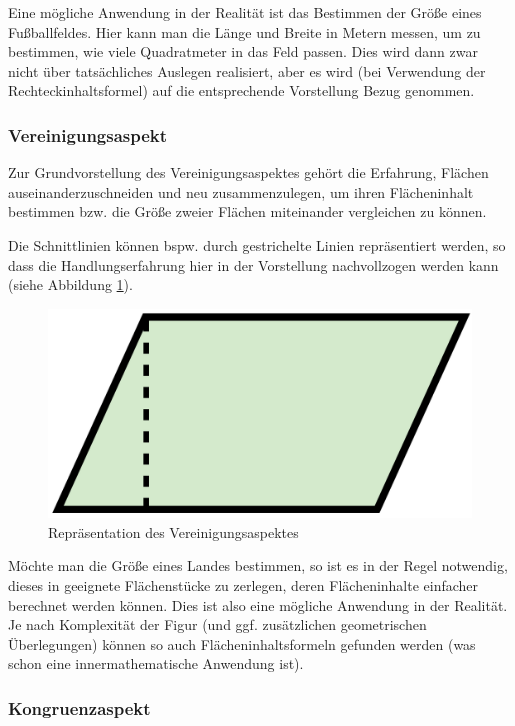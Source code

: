\documentclass[
  ngerman,
]{scrbook}
\theoremstyle{definition}
\theoremstyle{definition}
\theoremstyle{definition}
\theoremstyle{definition}
\theoremstyle{remark}
\begin{document}
Eine mögliche Anwendung in der Realität ist das Bestimmen der Größe eines Fußballfeldes. Hier kann man die Länge und Breite in Metern messen, um zu bestimmen, wie viele Quadratmeter in das Feld passen. Dies wird dann zwar nicht über tatsächliches Auslegen realisiert, aber es wird (bei Verwendung der Rechteckinhaltsformel) auf die entsprechende Vorstellung Bezug genommen.

\hypertarget{vereinigungsaspekt}{%
\subsubsection{Vereinigungsaspekt}\label{vereinigungsaspekt}}

Zur Grundvorstellung des Vereinigungsaspektes gehört die Erfahrung, Flächen auseinanderzuschneiden und neu zusammenzulegen, um ihren Flächeninhalt bestimmen bzw. die Größe zweier Flächen miteinander vergleichen zu können.

Die Schnittlinien können bspw. durch gestrichelte Linien repräsentiert werden, so dass die Handlungserfahrung hier in der Vorstellung nachvollzogen werden kann (siehe Abbildung \ref{fig:FlaecheVereinigung}).

\begin{figure}

{\centering \includegraphics[width=0.25\linewidth]{pictures/5-abb-Vereinigung} 

}

\caption{Repräsentation des Vereinigungsaspektes}\label{fig:FlaecheVereinigung}
\end{figure}

Möchte man die Größe eines Landes bestimmen, so ist es in der Regel notwendig, dieses in geeignete Flächenstücke zu zerlegen, deren Flächeninhalte einfacher berechnet werden können. Dies ist also eine mögliche Anwendung in der Realität. Je nach Komplexität der Figur (und ggf. zusätzlichen geometrischen Überlegungen) können so auch Flächeninhaltsformeln gefunden werden (was schon eine innermathematische Anwendung ist).

\hypertarget{kongruenzaspekt}{%
\subsubsection{Kongruenzaspekt}\label{kongruenzaspekt}}
\end{document}
